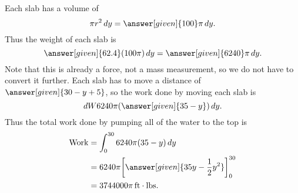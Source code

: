 \documentclass{ximera}
\begin{document}
\begin{example}
\begin{explanation}
\begin{image}
    \end{image}
    Each slab has a volume of
    \[
    \pi r^2 \d y = \answer[given]{100}\pi\d y.
    \]
    Thus the weight of each slab is
    \[
    \answer[given]{62.4}(100\pi)\d y = \answer[given]{6240}\pi \d y.
    \]
    Note that this is already a force, not a mass measurement, so we
    do not have to convert it further.  Each slab has to move a
    distance of $\answer[given]{30-y +5}$, so the work done by moving
    each slab is
          \[
          \d W 6240 \pi (\answer[given]{35-y}) \d y.
          \]
          Thus the total work done by pumping all of the water to the top is
          \begin{align*}
	    \mathrm{Work} &= \int_0^{30} 6240 \pi (35-y) \d y\\
	    &= 6240 \pi \eval{\answer[given]{35y-\frac{1}{2}y^2}}_0^{30}\\
	    &=  3744000 \pi \unit{ft}\cdot\unit{lbs}.
          \end{align*}
  \end{explanation}
\end{example}
\end{document}
